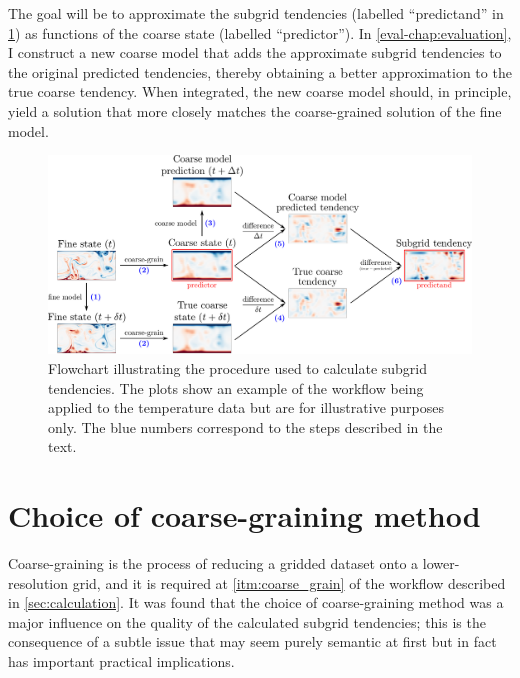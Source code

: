\documentclass[../main.tex]{subfiles}
\begin{document}
The goal will be to approximate the subgrid tendencies (labelled
``predictand'' in \cref{fig:method}) as functions of the coarse state (labelled
``predictor''). In \cref{eval-chap:evaluation}, I construct a new coarse model
that adds the approximate subgrid tendencies to the original predicted
tendencies, thereby obtaining a better approximation to the true coarse
tendency. When integrated, the new coarse model should, in principle,
yield a solution that more closely matches the coarse-grained solution of
the fine model.

\begin{figure}[ht]
    \centering
    \includegraphics[width=\linewidth]{figures/method_v2.pdf}
    \caption{
        Flowchart illustrating the procedure used to calculate subgrid
        tendencies. The plots show an example of the workflow being applied to
        the temperature data but are for illustrative purposes only. The blue
        numbers correspond to the steps described in the text.
    }
    \label{fig:method}
\end{figure}


\section{Choice of coarse-graining method} \label{sec:coarse_graining}
Coarse-graining is the process of reducing a gridded dataset onto a
lower-resolution grid, and it is required at \cref{itm:coarse_grain} of the
workflow described in \cref{sec:calculation}. It was found that the choice of
coarse-graining method was a major influence on the quality of the calculated
subgrid tendencies; this is the consequence of a subtle issue that may seem
purely semantic at first but in fact has important practical implications.
\end{document}
